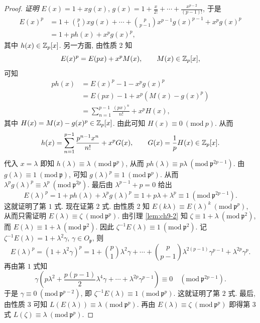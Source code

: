 \begin{proof}
\emph{证明} $E(x)=1+xg(x)$, $g(x)=1+\frac{x}{2!}+\cdots+\frac{x^{p-2}}{(p-1)!}$, 于是
\[
  \begin{aligned}
    E(x)^p&=1+\binom{p}{1}xg(x)+\cdots+\binom{p}{p-1}x^{p-1}g(x)^{p-1}+x^pg(x)^p\\
    &=1+ph(x)+x^pg(x)^p,
  \end{aligned}
\]
其中 $h(x)\in\mathbb{Z}_p[x]$. 另一方面, 由性质 2 知
\[
  E(x)^p=E(px)+x^pM(x),\qquad M(x)\in\mathbb{Z}_p[x],
\]
可知
\[
  \begin{aligned}
    ph(x)&=E(x)^p-1-x^pg(x)^p\\
    &=E(px)-1+x^p(M(x)-g(x)^p)\\
    &=\sum_{n=1}^{p-1}\frac{(px)^n}{n!}+x^pH(x),
  \end{aligned}
\]
其中 $H(x)=M(x)-g(x)^p\in\mathbb{Z}_p[x]$. 由此可知 $H(x)\equiv 0\ (\mathrm{mod}\ p)$. 从而
\[
  h(x)=\sum_{n=1}^{p-1}\frac{p^{n-1}x^n}{n!}+x^pG(x),\qquad
  G(x)=\frac{1}{p}H(x)\in\mathbb{Z}_p[x].
\]
代入 $x=\lambda$ 即知 $h(\lambda)\equiv\lambda\ (\mathrm{mod}\ \mathfrak{p}^p)$, 从而 $ph(\lambda)\equiv p\lambda\ (\mathrm{mod}\ \mathfrak{p}^{2p-1})$. 由 $g(\lambda)\equiv 1\ (\mathrm{mod}\ \mathfrak{p})$, 可知 $g(\lambda)^p\equiv 1\ (\mathrm{mod}\ \mathfrak{p}^p)$. 从而 $\lambda^pg(\lambda)^p\equiv\lambda^p\ (\mathrm{mod}\ \mathfrak{p}^{2p})$. 最后由 $\lambda^{p-1}+p=0$ 给出
\[
  E(\lambda)^p=1+ph(\lambda)+\lambda^pg(\lambda)^p
  \equiv 1+p\lambda+\lambda^p\equiv 1\ (\mathrm{mod}\ \mathfrak{p}^{2p-1}).
\]
这就证明了第 $1$ 式. 现在证第 $2$ 式. 由性质 2 知 $E(k\lambda)\equiv E(\lambda)^k\ (\mathrm{mod}\ \mathfrak{p}^p)$, 从而只需证明 $E(\lambda)\equiv\zeta\ (\mathrm{mod}\ \mathfrak{p}^p)$. 由引理 \ref{lem:ch9-2} 知 $\zeta\equiv 1+\lambda\ (\mathrm{mod}\ \mathfrak{p}^2)$, 而 $E(\lambda)\equiv 1+\lambda\ (\mathrm{mod}\ \mathfrak{p}^2)$. 因此 $\zeta^{-1}E(\lambda)\equiv 1\ (\mathrm{mod}\ \mathfrak{p}^2)$. 记 $\zeta^{-1}E(\lambda)=1+\lambda^2\gamma$, $\gamma\in O_{\mathfrak{p}}$, 则
\[
  E(\lambda)^p=(1+\lambda^2\gamma)^p
  =1+\binom{p}{1}\lambda^2\gamma+\cdots+\binom{p}{p-1}\lambda^{2(p-1)}\gamma^{p-1}+\lambda^{2p}\gamma^p.
\]
再由第 $1$ 式知
\[
  \gamma\left(p\lambda^2+\frac{p(p-1)}{2}\lambda^4\gamma+\cdots+\lambda^{2p}\gamma^{p-1}\right)\equiv 0
  \quad(\mathrm{mod}\ \mathfrak{p}^{2p-1}).
\]
于是 $\gamma\equiv 0\ (\mathrm{mod}\ \mathfrak{p}^{p-2})$, 即 $\zeta^{-1}E(\lambda)\equiv 1\ (\mathrm{mod}\ \mathfrak{p}^p)$. 这就证明了第 $2$ 式. 最后, 由性质 3 可知 $L(E(\lambda))\equiv\lambda\ (\mathrm{mod}\ \mathfrak{p}^p)$. 再由 $E(\lambda)\equiv\zeta\ (\mathrm{mod}\ \mathfrak{p}^p)$ 即得第 $3$ 式 $L(\zeta)\equiv\lambda\ (\mathrm{mod}\ \mathfrak{p}^p)$.


\end{proof}
